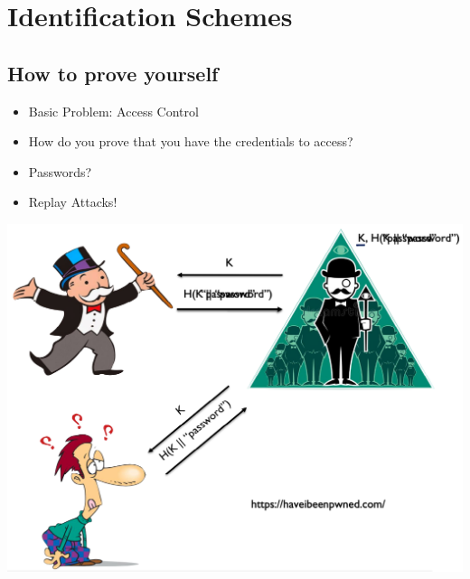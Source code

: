

\chapter{Identification Schemes}

\section{How to prove yourself}
    \begin{itemize}
        \item Basic Problem: Access Control
        \item How do you prove that you have the credentials to access?
        \item Passwords?
        \item Replay Attacks!
    \end{itemize}
    \begin{center}
	    \includegraphics[width=160mm]{Graphics/Digital Signatures/is1.png}
    \end{center}

